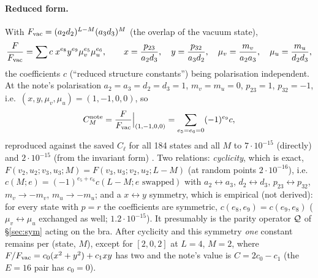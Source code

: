 \paragraph{Reduced form.} With $F_{\rm vac}=(a_2d_2)^{L-M}(a_3d_3)^M$ (the overlap of the vacuum state),
\begin{equation}
 \frac F{F_{\rm vac}}=\sum c\;x^{e_8}y^{e_9}\mu_v^{e_5}\mu_u^{e_6},\qquad
 x=\frac{p_{23}}{a_2d_3},\quad y=\frac{p_{32}}{a_3d_2},\quad \mu_v=\frac{m_v}{a_2a_3},\quad \mu_u=\frac{m_u}{d_2d_3},
\end{equation}
the coefficients $c$ (``reduced structure constants'') being polarisation independent. At the note's polarisation $a_2=a_3=d_2=d_3=1$, $m_v=m_u=0$, $p_{23}=1$, $p_{32}=-1$, i.e.\ $(x,y,\mu_v,\mu_u)=(1,-1,0,0)$, so
\begin{equation}
 C_{M}^{\rm note}=\frac F{F_{\rm vac}}\Big|_{(1,-1,0,0)}=\sum_{e_5=e_6=0}(-1)^{e_9}c ,
\end{equation}
reproduced against the saved $C_\ell$ for all 184 states and all $M$ to $7\cdot10^{-15}$ (directly) and $2\cdot10^{-15}$ (from the invariant form) \npy. Two relations: \emph{cyclicity}, which is exact,
$F(v_2,u_2;v_3,u_3;M)=F(v_3,u_3;v_2,u_2;L-M)$ (at random points $2\cdot10^{-16}$), i.e.\ $c(M;e)=(-1)^{e_5+e_6}c(L-M;e\text{ swapped})$ with $a_2\leftrightarrow a_3$, $d_2\leftrightarrow d_3$, $p_{23}\leftrightarrow p_{32}$,
$m_v\to-m_v$, $m_u\to-m_u$; and a $x\leftrightarrow y$ symmetry, which is empirical (not derived): for every state with $p=r$ the coefficients are symmetric, $c(e_8,e_9)=c(e_9,e_8)$ ($\mu_v\leftrightarrow\mu_u$ exchanged as well; $1.2\cdot10^{-15}$).
It presumably is the parity operator $\mathcal Q$ of \S\ref{sec:sym} acting on the bra. After cyclicity and this symmetry \emph{one} constant remains per (state, $M$), except for $[2,0,2]$ at $L=4$, $M=2$, where $F/F_{\rm vac}=c_0(x^2+y^2)+c_1xy$ has two and the note's value is $C=2c_0-c_1$
(the $E=16$ pair has $c_0=0$).


